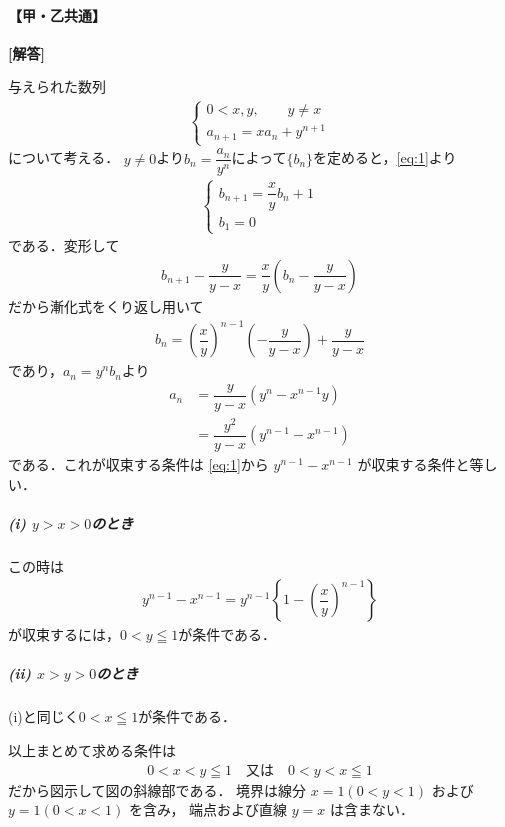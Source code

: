 \documentclass[../../main.tex]{subfiles}
\begin{document}
\begin{oframed}
  
\end{oframed}

\paragraph{【甲・乙共通】}

{\bf [解答]}

与えられた数列
\begin{align}
  \begin{cases}
    0<x,y,\qquad y\ne x \\
    a_{n+1} = xa_{n} + y^{n+1}
  \end{cases} \label{eq:1}
\end{align}
について考える．
$y \neq 0$より$b_n=\dfrac{a_n}{y^n}$によって$\{b_n\}$を定めると，\cref{eq:1}より
\begin{align}
  \begin{cases}
    b_{n+1}=\dfrac{x}{y}b_n+1 \\
    b_1 = 0
  \end{cases} \label{eq:2}
\end{align}
である．変形して
\begin{align}
  b_{n+1}-\dfrac{y}{y-x}=\dfrac{x}{y}\left(b_n-\dfrac{y}{y-x}\right)
\end{align}
だから漸化式をくり返し用いて
\begin{align}
  b_n=\left(\dfrac{x}{y}\right)^{n-1}\left(-\dfrac{y}{y-x}\right)+\dfrac{y}{y-x}
\end{align}
であり，$a_n=y^nb_n$より
\begin{align}
  a_n
  &=\dfrac{y}{y-x}\left(y^n-x^{n-1}y\right) \\
  &=\dfrac{y^2}{y-x}\left(y^{n-1}-x^{n-1}\right)
\end{align}
である．これが収束する条件は \cref{eq:1}から $y^{n-1}-x^{n-1}$ が収束する条件と等しい．

\subparagraph{(i) $y>x>0$のとき}

この時は
\begin{align}
  y^{n-1}-x^{n-1}=y^{n-1}\left\{1-\left(\dfrac{x}{y}\right)^{n-1}\right\}
\end{align}
が収束するには，$0<y\leqq1$が条件である．

\subparagraph{(ii) $x>y>0$のとき}

(i)と同じく$0<x\leqq1$が条件である．
\casesend

以上まとめて求める条件は
\begin{align}
  0<x<y\leqq1\quad\text{又は}\quad0<y<x\leqq1
\end{align}
だから図示して図の斜線部である．
境界は線分 $x = 1 (0 < y < 1)$ および $y = 1 (0 < x < 1)$ を含み，
端点および直線 $y = x$ は含まない．
\end{document}
